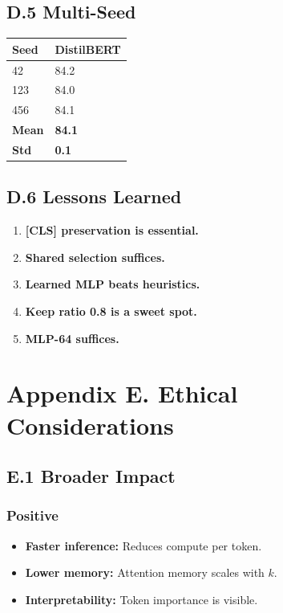 \subsection{D.5 Multi-Seed}

\begin{table}[H]
\centering
\small
\begin{tabular}{ll}
\toprule
\textbf{Seed} & \textbf{DistilBERT} \\
\midrule
42 & 84.2 \\
123 & 84.0 \\
456 & 84.1 \\
\textbf{Mean} & \textbf{84.1} \\
\textbf{Std} & \textbf{0.1} \\
\bottomrule
\end{tabular}
\end{table}

\subsection{D.6 Lessons Learned}

\begin{enumerate}
\item \textbf{[CLS] preservation is essential.}
\item \textbf{Shared selection suffices.}
\item \textbf{Learned MLP beats heuristics.}
\item \textbf{Keep ratio 0.8 is a sweet spot.}
\item \textbf{MLP-64 suffices.}

\end{enumerate}



\section{Appendix E. Ethical Considerations}

\subsection{E.1 Broader Impact}

\subsubsection{Positive}
\begin{itemize}
\item \textbf{Faster inference:} Reduces compute per token.
\item \textbf{Lower memory:} Attention memory scales with $k$.
\item \textbf{Interpretability:} Token importance is visible.

\end{itemize}
